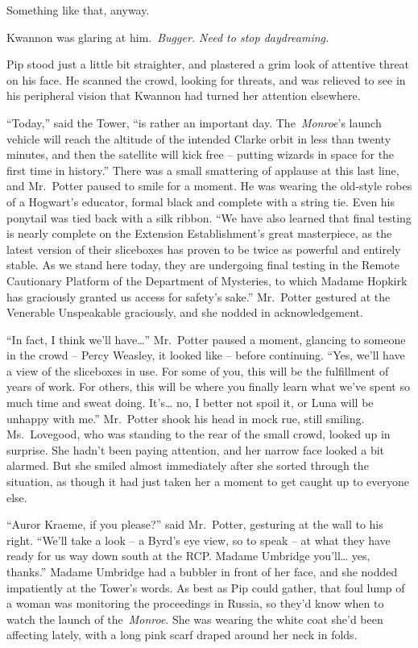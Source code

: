 Something like that, anyway.

Kwannon was glaring at him.~\emph{Bugger. Need to stop daydreaming.}

Pip stood just a little bit straighter, and plastered a grim look of
attentive threat on his face. He scanned the crowd, looking for threats,
and was relieved to see in his peripheral vision that Kwannon had turned
her attention elsewhere.

``Today,'' said the Tower, ``is rather an important day.
The~\emph{Monroe}'s launch vehicle will reach the altitude of the
intended Clarke orbit in less than twenty minutes, and then the
satellite will kick free -- putting wizards in space for the first time
in history.'' There was a small smattering of applause at this last
line, and Mr.~Potter paused to smile for a moment. He was wearing the
old-style robes of a Hogwart's educator, formal black and complete with
a string tie. Even his ponytail was tied back with a silk ribbon. ``We
have also learned that final testing is nearly complete on the Extension
Establishment's great masterpiece, as the latest version of their
sliceboxes has proven to be twice as powerful and entirely stable. As we
stand here today, they are undergoing final testing in the Remote
Cautionary Platform of the Department of Mysteries, to which Madame
Hopkirk has graciously granted us access for safety's sake.'' Mr.~Potter
gestured at the Venerable Unspeakable graciously, and she nodded in
acknowledgement.

``In fact, I think we'll have\ldots{}'' Mr.~Potter paused a moment,
glancing to someone in the crowd -- Percy Weasley, it looked like --
before continuing. ``Yes, we'll have a view of the sliceboxes in use.
For some of you, this will be the fulfillment of years of work. For
others, this will be where you finally learn what we've spent so much
time and sweat doing. It's\ldots{} no, I better not spoil it, or Luna
will be unhappy with me.'' Mr.~Potter shook his head in mock rue, still
smiling. Ms.~Lovegood, who was standing to the rear of the small crowd,
looked up in surprise. She hadn't been paying attention, and her narrow
face looked a bit alarmed. But she smiled almost immediately after she
sorted through the situation, as though it had just taken her a moment
to get caught up to everyone else.

``Auror Kraeme, if you please?'' said Mr.~Potter, gesturing at the wall
to his right. ``We'll take a look -- a Byrd's eye view, so to speak --
at what they have ready for us way down south at the RCP. Madame
Umbridge you'll\ldots{} yes, thanks.'' Madame Umbridge had a bubbler in
front of her face, and she nodded impatiently at the Tower's words. As
best as Pip could gather, that foul lump of a woman was monitoring the
proceedings in Russia, so they'd know when to watch the launch of
the~\emph{Monroe}. She was wearing the white coat she'd been affecting
lately, with a long pink scarf draped around her neck in folds.

